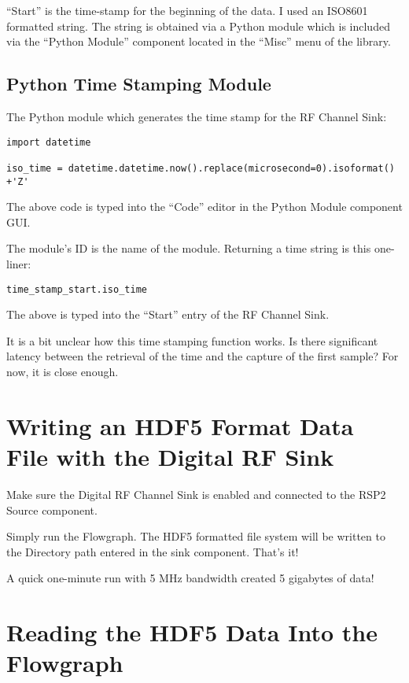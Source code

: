 ``Start'' is the time-stamp for the beginning of the data.  I used an ISO8601 formatted string.  The string is obtained via a Python module which is included via the ``Python Module'' component located in the ``Misc'' menu of the library.

\subsection{Python Time Stamping Module}

The Python module which generates the time stamp for the RF Channel Sink:

\begin{verbatim}
import datetime

iso_time = datetime.datetime.now().replace(microsecond=0).isoformat() +'Z'
\end{verbatim}

The above code is typed into the ``Code'' editor in the Python Module component GUI.

The module's ID is the name of the module.  Returning a time string is this one-liner:

\begin{verbatim}
time_stamp_start.iso_time
\end{verbatim}

The above is typed into the ``Start'' entry of the RF Channel Sink.

It is a bit unclear how this time stamping function works.  Is there significant latency between the retrieval of the time and the capture of the first sample?  For now, it is close enough.

\section{Writing an HDF5 Format Data File with the Digital RF Sink}

Make sure the Digital RF Channel Sink is enabled and connected to the RSP2 Source component.

Simply run the Flowgraph.  The HDF5 formatted file system will be written to the Directory path entered in the sink component.  That's it!

A quick one-minute run with 5 MHz bandwidth created 5 gigabytes of data!

\section{Reading the HDF5 Data Into the Flowgraph}

